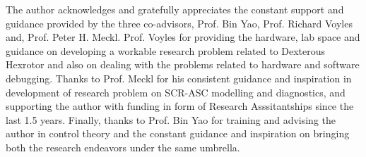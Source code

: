 {
\begin{acknowledgments}
        The author acknowledges and gratefully appreciates the constant support and guidance provided by the three co-advisors, Prof. Bin Yao, Prof. Richard Voyles and, Prof. Peter H. Meckl. Prof. Voyles for providing the hardware, lab space and guidance on developing a workable research problem related to Dexterous Hexrotor and also on dealing with the problems related to hardware and software debugging. Thanks to Prof. Meckl for his consistent guidance and inspiration in development of research problem on SCR-ASC modelling and diagnostics, and supporting the author with funding in form of Research Asssitantships since the last 1.5 years. Finally, thanks to Prof. Bin Yao for training and advising the author in control theory and the constant guidance and inspiration on bringing both the research endeavors under the same umbrella.
\end{acknowledgments}
}
